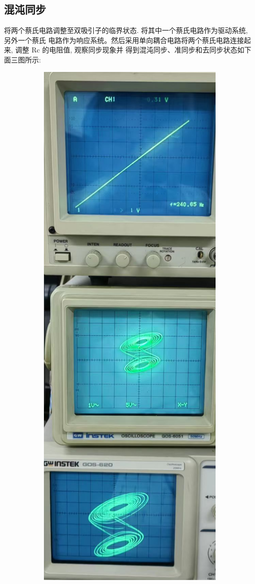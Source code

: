 \documentclass[12pt,a4paper]{article}
\begin{document}
\subsection{混沌同步}
将两个蔡氏电路调整至双吸引子的临界状态. 将其中一个蔡氏电路作为驱动系统, 另外一个蔡氏
电路作为响应系统。然后采用单向耦合电路将两个蔡氏电路连接起来, 调整 Rc 的电阻值, 观察同步现象并
得到混沌同步、准同步和去同步状态如下面三图所示: 
\begin{figure}[H]
    \centering
    \begin{subfigure}[b]{0.3\textwidth}
      \centering
      \includegraphics[width=\textwidth]{同步.jpg}

\end{subfigure}
\end{figure}
\end{document}
